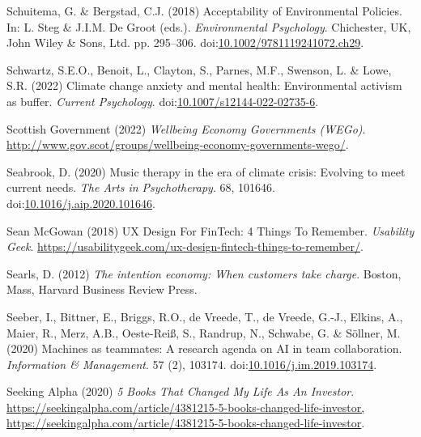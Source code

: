 \documentclass[
  letterpaper,
  DIV=11,
  numbers=noendperiod]{scrartcl}
\newlength{\cslhangindent}
\newenvironment{CSLReferences}[2] %
 {\begin{list}{}{%
  \setlength{\itemindent}{0pt}
  \setlength{\leftmargin}{0pt}
  \setlength{\parsep}{0pt}
  \ifodd #1
   \setlength{\leftmargin}{\cslhangindent}
   \setlength{\itemindent}{-1\cslhangindent}
  \fi
  \setlength{\itemsep}{#2\baselineskip}}}
 {\end{list}}
\begin{document}
\begin{CSLReferences}{0}{1}
Schuitema, G. \& Bergstad, C.J. (2018) Acceptability of {Environmental
Policies}. In: L. Steg \& J.I.M. De Groot (eds.). \emph{Environmental
{Psychology}}. Chichester, UK, John Wiley \& Sons, Ltd. pp. 295--306.
doi:\href{https://doi.org/10.1002/9781119241072.ch29}{10.1002/9781119241072.ch29}.

Schwartz, S.E.O., Benoit, L., Clayton, S., Parnes, M.F., Swenson, L. \&
Lowe, S.R. (2022) Climate change anxiety and mental health:
{Environmental} activism as buffer. \emph{Current Psychology}.
doi:\href{https://doi.org/10.1007/s12144-022-02735-6}{10.1007/s12144-022-02735-6}.

Scottish Government (2022) \emph{Wellbeing {Economy Governments}
({WEGo})}.
\url{http://www.gov.scot/groups/wellbeing-economy-governments-wego/}.

Seabrook, D. (2020) Music therapy in the era of climate crisis:
{Evolving} to meet current needs. \emph{The Arts in Psychotherapy}. 68,
101646.
doi:\href{https://doi.org/10.1016/j.aip.2020.101646}{10.1016/j.aip.2020.101646}.

Sean McGowan (2018) {UX Design For FinTech}: 4 {Things To Remember}.
\emph{Usability Geek}.
\url{https://usabilitygeek.com/ux-design-fintech-things-to-remember/}.

Searls, D. (2012) \emph{The intention economy: When customers take
charge}. Boston, Mass, Harvard Business Review Press.

Seeber, I., Bittner, E., Briggs, R.O., de Vreede, T., de Vreede, G.-J.,
Elkins, A., Maier, R., Merz, A.B., Oeste-Reiß, S., Randrup, N., Schwabe,
G. \& Söllner, M. (2020) Machines as teammates: {A} research agenda on
{AI} in team collaboration. \emph{Information \& Management}. 57 (2),
103174.
doi:\href{https://doi.org/10.1016/j.im.2019.103174}{10.1016/j.im.2019.103174}.

Seeking Alpha (2020) \emph{5 {Books That Changed My Life As An
Investor}}.
\href{https://seekingalpha.com/article/4381215-5-books-changed-life-investor,\%20https://seekingalpha.com/article/4381215-5-books-changed-life-investor}{https://seekingalpha.com/article/4381215-5-books-changed-life-investor,
https://seekingalpha.com/article/4381215-5-books-changed-life-investor}.


\end{CSLReferences}
\end{document}
